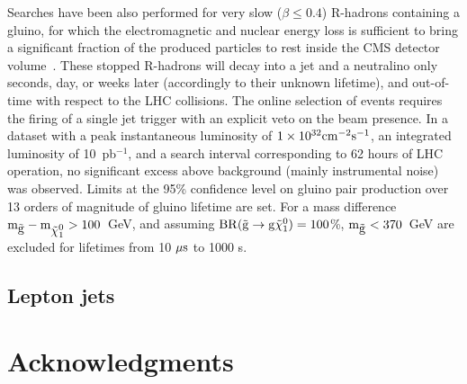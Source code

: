 \documentclass[11pt]{article}
\def\pb{pb$^{-1}$\xspace}
\def\gluino{$\tilde{\rm{g}}$\xspace}
\def\neutralino{$\tilde{\chi}^{0}_{1}$\xspace}
\begin{document}
Searches have been also performed for very slow ($\beta \le 0.4$) R-hadrons containing a gluino, 
for which the electromagnetic and nuclear energy loss is sufficient to bring a significant fraction 
of the produced particles to rest inside the CMS detector volume~\cite{PhysRevLett.106.011801}. 
These stopped R-hadrons will decay into a jet and a neutralino only seconds, day, or 
weeks later (accordingly to their unknown lifetime), and out-of-time with respect to the LHC collisions. 
The online selection of events requires the firing of a single jet trigger with an explicit veto on the beam presence.
In a dataset with a peak instantaneous luminosity of $1\times 10^{32}\rm{cm}^{-2}\rm{s}^{-1}$, 
an integrated luminosity of 10~\pb, and a search interval corresponding to 62 hours of LHC operation, 
no significant excess above background (mainly instrumental noise) was observed.  
Limits at the 95\% confidence level on gluino pair production over 13 orders of magnitude of gluino lifetime 
are set. For a mass difference $\rm{m}_{\mbox{\gluino}} - \rm{m}_{\mbox{\neutralino}} > 100$~GeV, and assuming 
$\rm{BR}( \mbox{\gluino} \rightarrow \rm{g} \mbox{\neutralino} ) = 100$\%, $\rm{m}_{\mbox{\gluino}}<370$~GeV 
are excluded for lifetimes from 10 $\mu\rm{s}$ to 1000 s.

\subsection{Lepton jets}



\section*{Acknowledgments}
\end{document}
